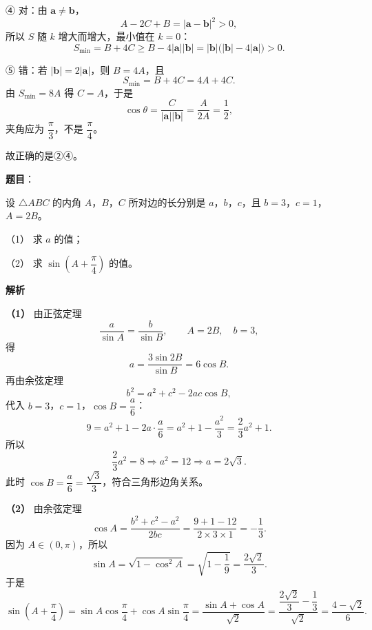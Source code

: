\begin{answer}
④ 对：由 $\boldsymbol a\neq\boldsymbol b$，
\nopagebreak[4]
\[A-2C+B=|\boldsymbol a-\boldsymbol b|^2>0,\]
所以 $S$ 随 $k$ 增大而增大，最小值在 $k=0$：
\nopagebreak[4]
\[S_{\min}=B+4C\geqslant B-4|\boldsymbol a||\boldsymbol b|
=|\boldsymbol b|\bigl(|\boldsymbol b|-4|\boldsymbol a|\bigr)>0 .\]

⑤ 错：若 $|\boldsymbol b|=2|\boldsymbol a|$，则 $B=4A$，且
\nopagebreak[4]
\[S_{\min}=B+4C=4A+4C .\]
由 $S_{\min}=8A$ 得 $C=A$，于是
\nopagebreak[4]
\[\cos\theta=\frac{C}{|\boldsymbol a||\boldsymbol b|}
=\frac{A}{2A}=\frac12,\]
夹角应为 $\dfrac\pi3$，不是 $\dfrac\pi4$。

故正确的是②④。


\end{answer}
\begin{answer}

\textbf{题目}：

设 $\triangle ABC$ 的内角 $A$，$B$，$C$ 所对边的长分别是 $a$，$b$，$c$，且 $b=3$，$c=1$，$A=2B$。

（1） 求 $a$ 的值；

（2） 求 $\sin\left(A+\dfrac\pi4\right)$ 的值。

\textbf{解析}

\textbf{（1）} 由正弦定理
\nopagebreak[4]
\[\frac a{\sin A}=\frac b{\sin B},\qquad A=2B,\quad b=3,\]
得
\nopagebreak[4]
\[a=\frac{3\sin2B}{\sin B}=6\cos B .\]
再由余弦定理
\nopagebreak[4]
\[b^2=a^2+c^2-2ac\cos B,\]
代入 $b=3$，$c=1$，$\cos B=\dfrac a6$：
\nopagebreak[4]
\[9=a^2+1-2a\cdot\frac a6
=a^2+1-\frac{a^2}3
=\frac23a^2+1 .\]
所以
\nopagebreak[4]
\[\frac23a^2=8\Longrightarrow a^2=12\Longrightarrow a=2\sqrt3 .\]
此时 $\cos B=\dfrac{a}{6}=\dfrac{\sqrt3}{3}$，符合三角形边角关系。

\textbf{（2）} 由余弦定理
\nopagebreak[4]
\[\cos A=\frac{b^2+c^2-a^2}{2bc}
=\frac{9+1-12}{2\times3\times1}
=-\frac13 .\]
因为 $A\in(0,\pi)$，所以
\nopagebreak[4]
\[\sin A=\sqrt{1-\cos^2A}=\sqrt{1-\frac19}=\frac{2\sqrt2}{3} .\]
于是
\nopagebreak[4]
\[\sin\left(A+\frac\pi4\right)
=\sin A\cos\frac\pi4+\cos A\sin\frac\pi4
=\frac{\sin A+\cos A}{\sqrt2}
=\frac{\dfrac{2\sqrt2}{3}-\dfrac13}{\sqrt2}
=\frac{4-\sqrt2}{6} .\]



\end{answer}
